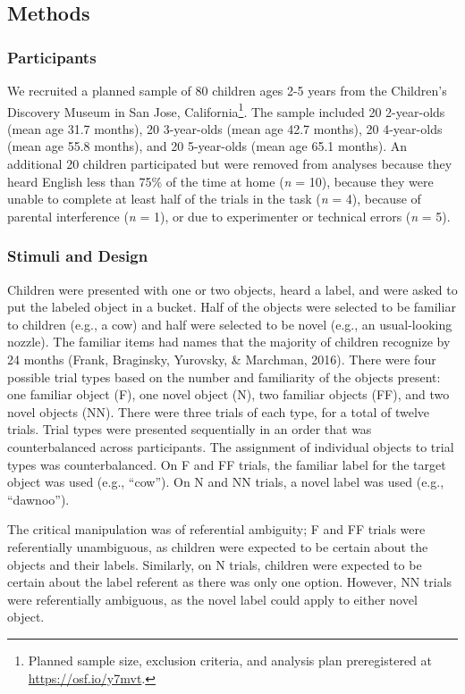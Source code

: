 \documentclass[english,man]{apa6}
\theoremstyle{definition}
\theoremstyle{definition}
\theoremstyle{definition}
\theoremstyle{remark}
\begin{document}
\subsection{Methods}\label{methods}

\subsubsection{Participants}\label{participants}

We recruited a planned sample of 80 children ages 2-5 years from the
Children's Discovery Museum in San Jose, California\footnote{Planned
  sample size, exclusion criteria, and analysis plan preregistered at
  \url{https://osf.io/y7mvt}.}. The sample included 20 2-year-olds (mean
age 31.7 months), 20 3-year-olds (mean age 42.7 months), 20 4-year-olds
(mean age 55.8 months), and 20 5-year-olds (mean age 65.1 months). An
additional 20 children participated but were removed from analyses
because they heard English less than 75\% of the time at home (\emph{n}
= 10), because they were unable to complete at least half of the trials
in the task (\emph{n} = 4), because of parental interference (\emph{n} =
1), or due to experimenter or technical errors (\emph{n} = 5).

\subsubsection{Stimuli and Design}\label{stimuli-and-design}

Children were presented with one or two objects, heard a label, and were
asked to put the labeled object in a bucket. Half of the objects were
selected to be familiar to children (e.g., a cow) and half were selected
to be novel (e.g., an usual-looking nozzle). The familiar items had
names that the majority of children recognize by 24 months (Frank,
Braginsky, Yurovsky, \& Marchman, 2016). There were four possible trial
types based on the number and familiarity of the objects present: one
familiar object (F), one novel object (N), two familiar objects (FF),
and two novel objects (NN). There were three trials of each type, for a
total of twelve trials. Trial types were presented sequentially in an
order that was counterbalanced across participants. The assignment of
individual objects to trial types was counterbalanced. On F and FF
trials, the familiar label for the target object was used (e.g.,
\enquote{cow}). On N and NN trials, a novel label was used (e.g.,
\enquote{dawnoo}).

The critical manipulation was of referential ambiguity; F and FF trials
were referentially unambiguous, as children were expected to be certain
about the objects and their labels. Similarly, on N trials, children
were expected to be certain about the label referent as there was only
one option. However, NN trials were referentially ambiguous, as the
novel label could apply to either novel object.
\end{document}
